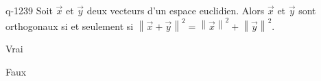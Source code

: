 \begin{truefalse}{q-1239}
Soit $\vec x$ et $\vec y$ deux vecteurs d'un espace euclidien. Alors $\vec x$ et $\vec y$ sont orthogonaux si et seulement si $\left\|\vec x+ \vec y\right\|^2=\left\|\vec x\right\|^2+\left\|\vec y\right\|^2$.
\item* Vrai
\item Faux
\end{truefalse}

